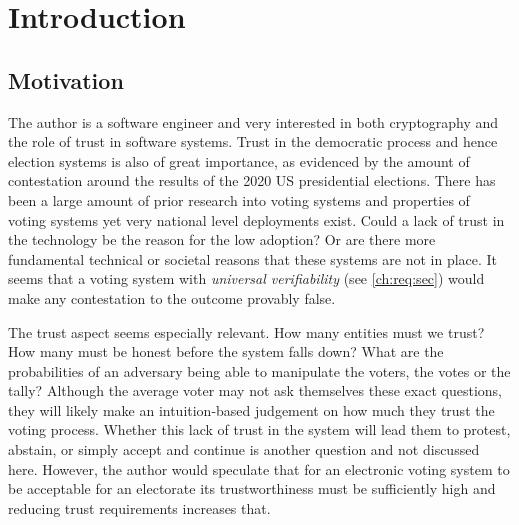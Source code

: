 \chapter{Introduction}
\label{ch:intro}

\section{Motivation}
\label{ch:intro:motiv}

The author is a software engineer and very interested in both cryptography and the role of trust in software systems. Trust in the democratic process and hence election systems is also of great importance, as evidenced by the amount of contestation around the results of the 2020 US presidential elections. There has been a large amount of prior research into voting systems \cite{
    panjaSecureEndtoendVerifiable2018,
    mccorrySmartContractBoardroom2017,
    liuEvotingProtocolBased2017,
    yangBlockchainVotingPublicly2020,
    spadaforaCoercionResistantBlockchainBasedEVoting2020,
    dimtiriouEfficientCoercionfreeUniversally2019,
    tsoukalasHeliosZeus2013,
    xiaVersatilePretVoter2010,
    ryanPrEtVoterVoterVerifiable2010,
    yuPlatformindependentSecureBlockchainBased2018,
    seifelnasrScalableOpenVoteNetwork2020,
    gajekTrustlessCensorshipResilientScalable2019,
    chillottiHomomorphicLWEBased} and properties of voting systems yet very national level deployments exist. Could a lack of trust in the technology be the reason for the low adoption? Or are there more fundamental technical or societal reasons that these systems are not in place. It seems that a voting system with \emph{universal verifiability} (see \autoref{ch:req:sec}) would make any contestation to the outcome provably false.

The trust aspect seems especially relevant. How many entities must we trust? How many must be honest before the system falls down? What are the probabilities of an adversary being able to manipulate the voters, the votes or the tally? Although the average voter may not ask themselves these exact questions, they will likely make an intuition-based judgement on how much they trust the voting process. Whether this lack of trust in the system will lead them to protest, abstain, or simply accept and continue is another question and not discussed here. However, the author would speculate that for an electronic voting system to be acceptable for an electorate its trustworthiness must be sufficiently high and reducing trust requirements increases that.


